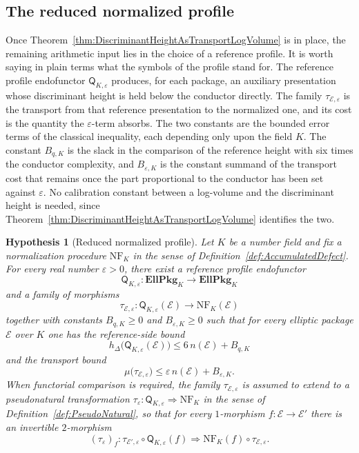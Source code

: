 \documentclass[10pt, reqno]{amsart}
\theoremstyle{plain}
\theoremstyle{definition}
\theoremstyle{plain}
\newtheorem{hypothesis}[theorem]{Hypothesis}
\begin{document}
\subsection{The reduced normalized profile}\label{subsec:ReducedProfile}

Once Theorem~\ref{thm:DiscriminantHeightAsTransportLogVolume} is in place, the remaining arithmetic input lies in the choice of a reference profile. It is worth saying in plain terms what the symbols of the profile stand for. The reference profile endofunctor $\mathsf{Q}_{K,\varepsilon}$ produces, for each package, an auxiliary presentation whose discriminant height is held below the conductor directly. The family $\tau_{\mathcal{E},\varepsilon}$ is the transport from that reference presentation to the normalized one, and its cost is the quantity the $\varepsilon$-term absorbs. The two constants are the bounded error terms of the classical inequality, each depending only upon the field $K$. The constant $B_{q,K}$ is the slack in the comparison of the reference height with six times the conductor complexity, and $B_{\varepsilon,K}$ is the constant summand of the transport cost that remains once the part proportional to the conductor has been set against $\varepsilon$. No calibration constant between a log-volume and the discriminant height is needed, since Theorem~\ref{thm:DiscriminantHeightAsTransportLogVolume} identifies the two.

\begin{hypothesis}[Reduced normalized profile]\label{hyp:ReducedNormalizedProfile}
Let $K$ be a number field and fix a normalization procedure $\mathrm{NF}_K$ in the sense of Definition~\ref{def:AccumulatedDefect}. For every real number $\varepsilon>0$, there exist a reference profile endofunctor
\[
  \mathsf{Q}_{K,\varepsilon}
  \colon
  \mathbf{EllPkg}_K\longrightarrow\mathbf{EllPkg}_K
\]
and a family of morphisms
\[
  \tau_{\mathcal{E},\varepsilon}
  \colon
  \mathsf{Q}_{K,\varepsilon}(\mathcal{E})
  \longrightarrow
  \mathrm{NF}_K(\mathcal{E})
\]
together with constants $B_{q,K}\ge 0$ and $B_{\varepsilon,K}\ge 0$ such that for every elliptic package $\mathcal{E}$ over $K$ one has the reference-side bound
\[
  h_\Delta\bigl(\mathsf{Q}_{K,\varepsilon}(\mathcal{E})\bigr)
  \le
  6\,n(\mathcal{E})+B_{q,K}
\]
and the transport bound
\[
  \mu\bigl(\tau_{\mathcal{E},\varepsilon}\bigr)
  \le
  \varepsilon\,n(\mathcal{E})+B_{\varepsilon,K}.
\]
When functorial comparison is required, the family $\tau_{\mathcal{E},\varepsilon}$ is assumed to extend to a pseudonatural transformation $\tau_{\varepsilon}\colon\mathsf{Q}_{K,\varepsilon}\Rightarrow\mathrm{NF}_K$ in the sense of Definition~\ref{def:PseudoNatural}, so that for every $1$-morphism $f\colon\mathcal{E}\to\mathcal{E}'$ there is an invertible $2$-morphism
\[
  (\tau_\varepsilon)_f \colon
  \tau_{\mathcal{E}',\varepsilon}\circ \mathsf{Q}_{K,\varepsilon}(f)
  \Rightarrow
  \mathrm{NF}_K(f)\circ \tau_{\mathcal{E},\varepsilon}.
\]
\end{hypothesis}
\end{document}
